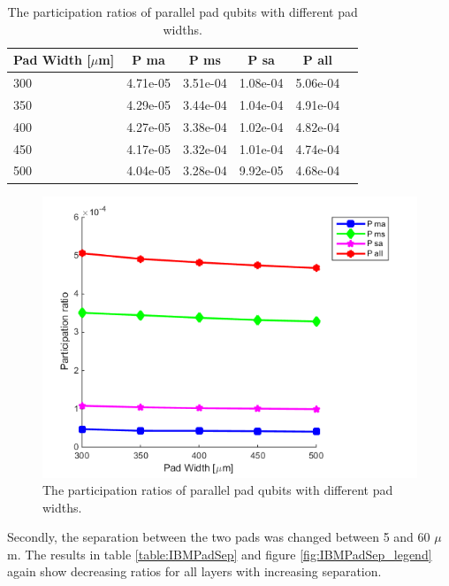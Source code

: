  \begin{table}
 	\begin{center}
 		\begin{tabular}{ | l || c | c | c | c | c |}
 			\hline
 			Pad Width [\(\mu\)m] & P ma & P ms & P sa & P all \\ \hline
 			300 & 4.71e-05 & 3.51e-04 & 1.08e-04 & 5.06e-04 \\
 			350 & 4.29e-05 & 3.44e-04 & 1.04e-04 & 4.91e-04 \\
 			400 & 4.27e-05 & 3.38e-04 & 1.02e-04 & 4.82e-04 \\
 			450 & 4.17e-05 & 3.32e-04 & 1.01e-04 & 4.74e-04 \\
 			500 & 4.04e-05 & 3.28e-04 & 9.92e-05 & 4.68e-04\\
 			\hline
 		\end{tabular}
 	\end{center}
 	\caption{The participation ratios of parallel pad qubits with different pad widths.}
 	\label{table:ratio_IBMPadWidth}
 \end{table}
 
 \begin{figure}
 	\centering
 	\includegraphics[scale = 0.7]{Figures/Ratio_plots/IBMPadWidth_legend}
 	\caption{The participation ratios of parallel pad qubits with different pad widths.}
 	\label{fig:IBMPadWidth_legend}
 \end{figure}
 
 Secondly, the separation between the two pads was changed between 5 and 60 \(\mu\)m. The results in table \ref{table:IBMPadSep} and figure \ref{fig:IBMPadSep_legend} again show decreasing ratios for all layers with increasing separation. 
 
